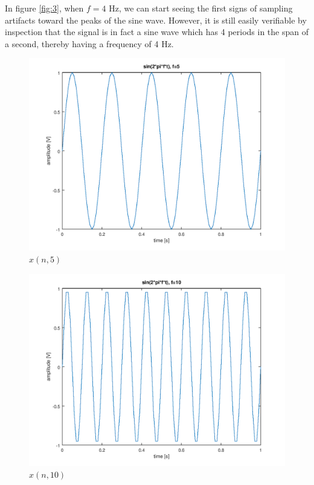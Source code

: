 \documentclass[a4paper, 12pt]{report}
\begin{document}
			In figure \ref{fig:3}, when $f=4$ Hz, we can start seeing the first signs of sampling artifacts toward the peaks of the sine wave. However, it is still easily verifiable by inspection that the signal is in fact a sine wave which has 4 periods in the span of a second, thereby having a frequency of 4 Hz.

			\begin{figure}[H]
				\includegraphics[width=\textwidth]{img/1_4.png}
				\caption{$x(n, 5)$}
				\label{fig:4}
			\end{figure}

			\begin{figure}[H]
				\includegraphics[width=\textwidth]{img/1_5.png}
				\caption{$x(n, 10)$}
				\label{fig:5}
			\end{figure}
\end{document}
